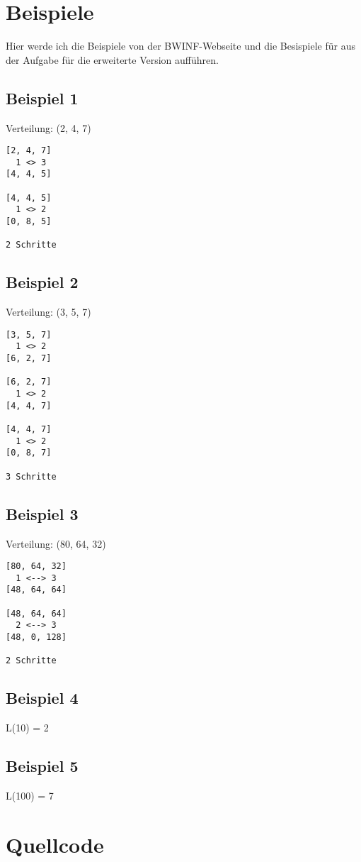 \documentclass[a4paper,10pt]{scrartcl}
\begin{document}
\section{Beispiele}
Hier werde ich die Beispiele von der BWINF-Webseite und die Besispiele für aus der Aufgabe für die erweiterte Version aufführen.

\subsection{Beispiel 1}
Verteilung: (2, 4, 7)
\begin{lstlisting}
[2, 4, 7]
  1 <> 3
[4, 4, 5]

[4, 4, 5]
  1 <> 2
[0, 8, 5]

2 Schritte
\end{lstlisting}

\subsection{Beispiel 2}
Verteilung: (3, 5, 7)
\begin{lstlisting}
[3, 5, 7]
  1 <> 2
[6, 2, 7]

[6, 2, 7]
  1 <> 2
[4, 4, 7]

[4, 4, 7]
  1 <> 2
[0, 8, 7]

3 Schritte
\end{lstlisting}

\subsection{Beispiel 3}
Verteilung: (80, 64, 32)
\begin{lstlisting}
[80, 64, 32]
  1 <--> 3
[48, 64, 64]

[48, 64, 64]
  2 <--> 3
[48, 0, 128]

2 Schritte
\end{lstlisting}

\subsection{Beispiel 4}
L(10) = 2

\subsection{Beispiel 5}
L(100) = 7

\section{Quellcode}
\lstset{numbers=left}

\end{document}
